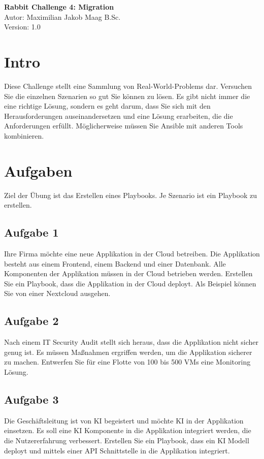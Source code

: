 \documentclass{article}
\begin{document}
    \begin{center}
        \Large \textbf{Rabbit Challenge 4: Migration} \\ [6pt]
        \normalsize
        Autor: Maximilian Jakob Maag B.Sc. \\
        Version: 1.0
    \end{center}

    \section{Intro}
    Diese Challenge stellt eine Sammlung von Real-World-Problems dar.
    Versuchen Sie die einzelnen Szenarien so gut Sie können zu lösen.
    Es gibt nicht immer die eine richtige Lösung, sondern es geht darum, dass Sie sich mit  den Herausforderungen auseinandersetzen und eine Lösung erarbeiten, die die Anforderungen erfüllt.
    Möglicherweise müssen Sie Ansible mit anderen Tools kombinieren.

    \section{Aufgaben}
    Ziel der Übung ist das Erstellen eines Playbooks.
    Je Szenario ist ein Playbook zu erstellen.

    \subsection{Aufgabe 1}
    Ihre Firma möchte eine neue Applikation in der Cloud betreiben.
    Die Applikation besteht aus einem Frontend, einem Backend und einer Datenbank.
    Alle Komponenten der Applikation müssen in der Cloud betrieben werden.
    Erstellen Sie ein Playbook, dass die Applikation in der Cloud deployt. 
    Als Beispiel können Sie von einer Nextcloud ausgehen.

    \subsection{Aufgabe 2}
    Nach einem IT Security Audit stellt sich heraus, dass die Applikation nicht sicher genug ist.
    Es müssen Maßnahmen ergriffen werden, um die Applikation sicherer zu machen.
    Entwerfen Sie für eine Flotte von 100 bis 500 VMs eine Monitoring Lösung.

    \subsection{Aufgabe 3}
    Die Geschäftsleitung ist von KI begeistert und möchte KI in der Applikation einsetzen.
    Es soll eine KI Komponente in die Applikation integriert werden, die die Nutzererfahrung verbessert.
    Erstellen Sie ein Playbook, dass ein KI Modell deployt und mittels einer API Schnittstelle in die Applikation integriert.
\end{document}
